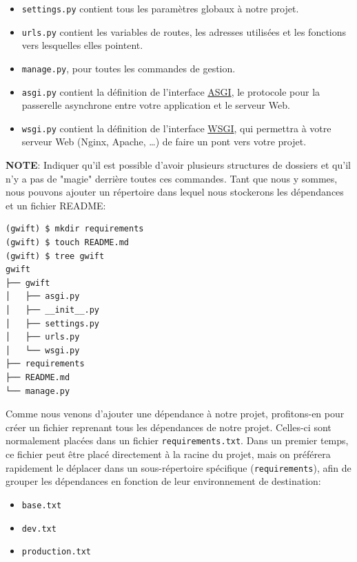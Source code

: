 \documentclass[11pt]{amsbook}
\newcommand{\admonition}[2]{\textbf{#1}: {#2}}
\begin{document}
\begin{itemize}

\item \texttt{settings.py} contient tous les paramètres globaux à notre projet.

\item \texttt{urls.py} contient les variables de routes, les adresses utilisées et les fonctions vers lesquelles elles pointent.

\item \texttt{manage.py}, pour toutes les commandes de gestion.

\item \texttt{asgi.py} contient la définition de l’interface \href{https://en.wikipedia.org/wiki/Asynchronous_Server_Gateway_Interface}{ASGI}, le protocole pour la passerelle asynchrone entre votre application et le serveur Web.

\item \texttt{wsgi.py} contient la définition de l’interface \href{https://en.wikipedia.org/wiki/Web_Server_Gateway_Interface}{WSGI}, qui permettra à votre serveur Web (Nginx, Apache, …​) de faire un pont vers votre projet.

\end{itemize}


\admonition{NOTE}{Indiquer qu’il est possible d’avoir plusieurs structures de dossiers et qu’il n’y a pas de "magie" derrière toutes ces commandes.}
Tant que nous y sommes, nous pouvons ajouter un répertoire dans lequel nous stockerons les dépendances et un fichier README:


\begin{verbatim}
(gwift) $ mkdir requirements
(gwift) $ touch README.md
(gwift) $ tree gwift
gwift
├── gwift
│   ├── asgi.py
│   ├── __init__.py
│   ├── settings.py
│   ├── urls.py
│   └── wsgi.py
├── requirements 
├── README.md 
└── manage.py
\end{verbatim}


Comme nous venons d’ajouter une dépendance à notre projet, profitons-en pour créer un fichier reprenant tous les dépendances de notre projet.
Celles-ci sont normalement placées dans un fichier \texttt{requirements.txt}.
Dans un premier temps, ce fichier peut être placé directement à la racine du projet, mais on préférera rapidement le déplacer dans un sous-répertoire spécifique (\texttt{requirements}), afin de grouper les dépendances en fonction de leur environnement de destination:


\begin{itemize}

\item \texttt{base.txt}

\item \texttt{dev.txt}

\item \texttt{production.txt}

\end{itemize}
\end{document}
